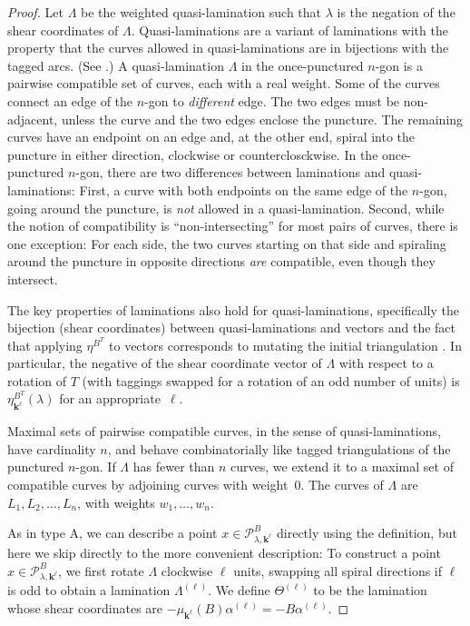 \documentclass{amsart}
\theoremstyle{definition}
\theoremstyle{remark}
\numberwithin{equation}{section}
\newcommand{\0}{{\mathbf{0}}}
\newcommand{\kk}{{\boldsymbol{k}}}
\renewcommand{\P}{\mathcal{P}}
\begin{document}
\begin{proof}
Let $\Lambda$ be the weighted quasi-lamination such that $\lambda$ is the negation of the shear coordinates of $\Lambda$.
Quasi-laminations are a variant of laminations with the property that the curves allowed in quasi-laminations are in bijections with the tagged arcs.
(See \cite[Section~4]{unisurface}.)
A quasi-lamination $\Lambda$ in the once-punctured $n$-gon is a pairwise compatible set of curves, each with a real weight.
Some of the curves connect an edge of the $n$-gon to \emph{different} edge.
The two edges must be non-adjacent, unless the curve and the two edges enclose the puncture.
The remaining curves have an endpoint on an edge and, at the other end, spiral into the puncture in either direction, clockwise or counterclosckwise.
In the once-punctured $n$-gon, there are two differences between laminations and quasi-laminations:
First, a curve with both endpoints on the same edge of the $n$-gon, going around the puncture, is \emph{not} allowed in a quasi-lamination.
Second, while the notion of compatibility is ``non-intersecting'' for most pairs of curves, there is one exception:  
For each side, the two curves starting on that side and spiraling around the puncture in opposite directions \emph{are} compatible, even though they intersect.

The key properties of laminations also hold for quasi-laminations, specifically the bijection (shear coordinates) between quasi-laminations and vectors \cite[Theorem~4.4]{unisurface} and the fact that applying $\eta^{B^T}$ to vectors corresponds to mutating the initial triangulation \cite[Theorem~4.3]{unisurface}.
In particular, the negative of the shear coordinate vector of $\Lambda$ with respect to a rotation of $T$ (with taggings swapped for a rotation of an odd number of units) is $\eta^{B^T}_{\kk^\ell}(\lambda)$ for an appropriate~$\ell$.

Maximal sets of pairwise compatible curves, in the sense of quasi-laminations, have cardinality $n$, and behave combinatorially like tagged triangulations of the punctured $n$-gon.
If $\Lambda$ has fewer than $n$ curves, we extend it to a maximal set of compatible curves by adjoining curves with weight~$0$.
The curves of $\Lambda$ are $L_1,L_2,\ldots,L_n$, with weights $w_1,\ldots,w_n$.

As in type A, we can describe a point $x\in\P^B_{\lambda,\kk^\ell}$ directly using the definition,  %
but here we skip directly to the more convenient description:
To construct a point $x\in\P^B_{\lambda,\kk^\ell}$, we first rotate $\Lambda$ clockwise $\ell$ units, swapping all spiral directions if $\ell$ is odd to obtain a lamination $\Lambda^{(\ell)}$.
We define $\Theta^{(\ell)}$ to be the lamination whose shear coordinates are $-\mu_{\kk^\ell}(B)\alpha^{(\ell)}=-B\alpha^{(\ell)}$.


\end{proof}
\end{document}
